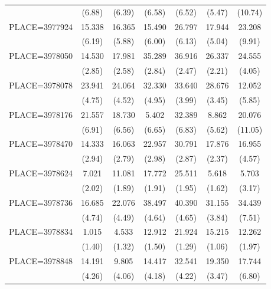 {\begin{tabular}{l*{6}{c}}
                    &      (6.88)&      (6.39)&      (6.58)&      (6.52)&      (5.47)&     (10.74)\\
PLACE=3977924       &      15.338&      16.365&      15.490&      26.797&      17.944&      23.208\\
                    &      (6.19)&      (5.88)&      (6.00)&      (6.13)&      (5.04)&      (9.91)\\
PLACE=3978050       &      14.530&      17.981&      35.289&      36.916&      26.337&      24.555\\
                    &      (2.85)&      (2.58)&      (2.84)&      (2.47)&      (2.21)&      (4.05)\\
PLACE=3978078       &      23.941&      24.064&      32.330&      33.640&      28.676&      12.052\\
                    &      (4.75)&      (4.52)&      (4.95)&      (3.99)&      (3.45)&      (5.85)\\
PLACE=3978176       &      21.557&      18.730&       5.402&      32.389&       8.862&      20.076\\
                    &      (6.91)&      (6.56)&      (6.65)&      (6.83)&      (5.62)&     (11.05)\\
PLACE=3978470       &      14.333&      16.063&      22.957&      30.791&      17.876&      16.955\\
                    &      (2.94)&      (2.79)&      (2.98)&      (2.87)&      (2.37)&      (4.57)\\
PLACE=3978624       &       7.021&      11.081&      17.772&      25.511&       5.618&       5.703\\
                    &      (2.02)&      (1.89)&      (1.91)&      (1.95)&      (1.62)&      (3.17)\\
PLACE=3978736       &      16.685&      22.076&      38.497&      40.390&      31.155&      34.439\\
                    &      (4.74)&      (4.49)&      (4.64)&      (4.65)&      (3.84)&      (7.51)\\
PLACE=3978834       &       1.015&       4.533&      12.912&      21.924&      15.215&      12.262\\
                    &      (1.40)&      (1.32)&      (1.50)&      (1.29)&      (1.06)&      (1.97)\\
PLACE=3978848       &      14.191&       9.805&      14.417&      32.541&      19.350&      17.744\\
                    &      (4.26)&      (4.06)&      (4.18)&      (4.22)&      (3.47)&      (6.80)\\

\end{tabular}}

